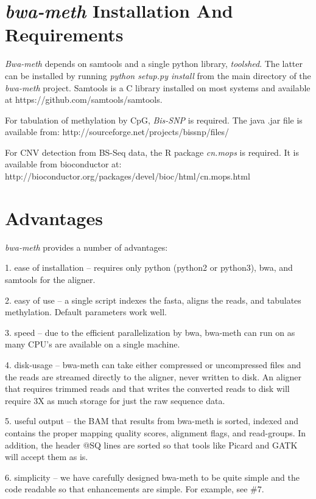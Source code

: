 \documentclass[12pt]{article}
\begin{document}
\section{\textit{bwa-meth} Installation And Requirements}

\textit{Bwa-meth} depends on samtools and a single python library, \textit{toolshed}.
The latter can be installed by running \emph{python setup.py install} from the main
directory of the \textit{bwa-meth} project. Samtools is a C library installed on most
systems and available at https://github.com/samtools/samtools.

For tabulation of methylation by CpG, \emph{Bis-SNP} \cite{bissnp} is required.
The java .jar file is available from: http://sourceforge.net/projects/bissnp/files/

For CNV detection from BS-Seq data, the R package \emph{cn.mops} \cite{cnmops} is required.
It is available
from bioconductor \cite{bioconductor} at: http://bioconductor.org/packages/devel/bioc/html/cn.mops.html

\section{Advantages}
\textit{bwa-meth} provides a number of advantages:

1. ease of installation -- requires only python (python2 or python3), bwa,
   and samtools for the aligner.

2. easy of use -- a single script indexes the fasta, aligns the reads, and
   tabulates methylation. Default parameters work well.

3. speed -- due to the efficient parallelization by bwa, bwa-meth can run on
   as many CPU's are available on a single machine.

4. disk-usage -- bwa-meth can take either compressed or uncompressed files
   and the reads are streamed directly to the aligner, never written to disk. An
   aligner that requires trimmed reads and that writes the converted reads to
   disk will require 3X as much storage for just the raw sequence data.

5. useful output -- the BAM that results from bwa-meth is sorted, indexed and
   contains the proper mapping quality scores, alignment flags, and read-groups.
   In addition, the header @SQ lines are sorted so that tools like Picard and
   GATK will accept them as is.

6. simplicity -- we have carefully designed bwa-meth to be quite simple and
   the code readable so that enhancements are simple. For example, see \#7.
\end{document}

